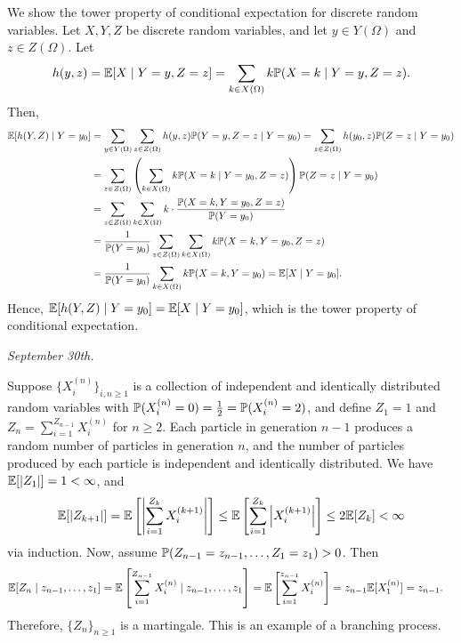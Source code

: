 \begin{remark}
    We show the tower property of conditional expectation for discrete random variables. Let $X,Y,Z$ be discrete random variables, and let $y \in Y(\Omega)$ and $z \in Z(\Omega)$. Let
    \begin{align}
        h(y,z) = \mathbb{E}[X \mid Y=y,Z=z] = \sum_{k \in X(\Omega)} k \mathbb{P}(X=k \mid Y=y,Z=z).
    \end{align}
    Then,
    \begin{align}
        \mathbb{E}[h(Y,Z) \mid Y=y_{0}] &= \sum_{y \in Y(\Omega)} \sum_{z \in Z(\Omega)} h(y,z) \mathbb{P}(Y=y,Z=z \mid Y=y_{0}) = \sum_{z \in Z(\Omega)} h(y_{0},z) \mathbb{P}(Z=z \mid Y=y_{0}) \notag \\
        &= \sum_{z \in Z(\Omega)} \left( \sum_{k \in X(\Omega)} k \mathbb{P}(X=k \mid Y=y_{0},Z=z) \right) \mathbb{P}(Z=z \mid Y = y_{0}) \notag \\
        &= \sum_{z \in Z(\Omega)} \sum_{k \in X(\Omega)} k \cdot \frac{\mathbb{P}(X=k,Y=y_{0},Z=z)}{\mathbb{P}(Y=y_{0})} \notag \\
        &= \frac{1}{\mathbb{P}(Y=y_{0})}\sum_{z \in Z(\Omega)} \sum_{k \in X(\Omega)} k \mathbb{P}(X=k,Y=y_{0},Z=z) \notag \\
        &= \frac{1}{\mathbb{P}(Y=y_{0})}\sum_{k \in X(\Omega)} k \mathbb{P}(X=k,Y=y_{0}) = \mathbb{E}[X \mid Y=y_{0}].
    \end{align}
    Hence, $\mathbb{E}[h(Y,Z) \mid Y=y_{0}] = \mathbb{E}[X \mid Y=y_{0}]$, which is the tower property of conditional expectation.
\end{remark}

\textit{September 30th.}
\begin{example}
    Suppose $\{X_{i}^{(n)}\}_{i,n\geq 1}$ is a collection of independent and identically distributed random variables with $\mathbb{P}(X_{i}^{(n)}=0) = \frac{1}{2} = \mathbb{P}(X_{i}^{(n)}=2)$, and define $Z_{1} = 1$ and $Z_{n} = \sum_{i=1}^{Z_{n-1}} X_{i}^{(n)}$ for $n \geq 2$. Each particle in generation $n-1$ produces a random number of particles in generation $n$, and the number of particles produced by each particle is independent and identically distributed. We have $\mathbb{E}[\left| Z_{1} \right|] = 1 < \infty$, and
    \begin{align}
        \mathbb{E}[\left| Z_{k+1} \right|] = \mathbb{E}\left[\left| \sum_{i=1}^{Z_{k}} X_{i}^{(k+1)} \right|\right] \leq \mathbb{E}\left[\sum_{i=1}^{Z_{k}} \left| X_{i}^{(k+1)} \right|\right] \leq 2\mathbb{E}[Z_{k}] < \infty
    \end{align}
    via induction. Now, assume $\mathbb{P}(Z_{n-1}=z_{n-1},\ldots,Z_{1}=z_{1}) > 0$. Then
    \begin{align}
        \mathbb{E}[Z_{n} \mid z_{n-1},\ldots,z_{1}] &= \mathbb{E}\left[\sum_{i=1}^{Z_{n-1}} X_{i}^{(n)} \mid z_{n-1},\ldots,z_{1}\right] = \mathbb{E}\left[\sum_{i=1}^{z_{n-1}} X_{i}^{(n)}\right] = z_{n-1} \mathbb{E}[X_{1}^{(n)}] = z_{n-1}.
    \end{align}
    Therefore, $\{Z_{n}\}_{n \geq 1}$ is a martingale. This is an example of a branching process.
\end{example}


